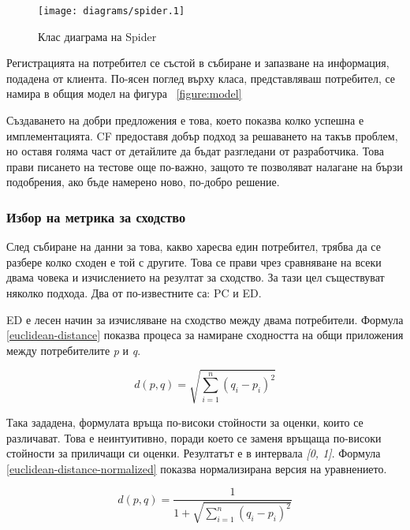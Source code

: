 		\begin{figure}[htbp]
			\centering
 			\texttt{[image: diagrams/spider.1]}
			\caption{Клас диаграма на Spider}
			\label{figure:spider}
		\end{figure}
		
		Регистрацията на потребител се състой в събиране и запазване на информация, подадена от клиента. По-ясен поглед върху класа, представляваш потребител, се намира в общия модел на фигура ~\ref{figure:model}
		
		Създаването на добри предложения е това, което показва колко успешна е имплементацията. \ac{CF} предоставя добър подход за решаването на такъв проблем, но оставя голяма част от детайлите да бъдат разгледани от разработчика.
		Това прави писането на тестове още по-важно, защото те позволяват налагане на бързи подобрения, ако бъде намерено ново, по-добро решение.
		
		\subsubsection{Избор на метрика за сходство}
		
		След събиране на данни за това, какво харесва един потребител, трябва да се разбере колко сходен е той с другите. Това се прави чрез сравняване на всеки двама човека и изчислението на резултат за сходство. За тази цел съществуват няколко подхода. Два от по-известните са: \ac{PC} и \ac{ED}.
		
		\ac{ED} е лесен начин за изчисляване на сходство между двама потребители. Формула \eqref{euclidean-distance} показва процеса за намиране сходността на общи приложения между потребителите \emph{p} и \emph{q}.
		
		\begin{equation}\label{euclidean-distance}
			d(p, q) = \sqrt{\sum\limits_{i=1}^n(q_i - p_i)^2}
		\end{equation}
		
		Така зададена, формулата връща по-високи стойности за оценки, които се различават. Това е неинтуитивно, поради което се заменя връщаща по-високи стойности за приличащи си оценки. Резултатът е в интервала \emph{[0, 1]}\cite{Segaran}. Формула \eqref{euclidean-distance-normalized} показва нормализирана версия на уравнението.

		\begin{equation}\label{euclidean-distance-normalized}
			d(p, q) = \frac{1}{1 + \sqrt{\sum\limits_{i=1}^n(q_i - p_i)^2}}
		\end{equation}
		
